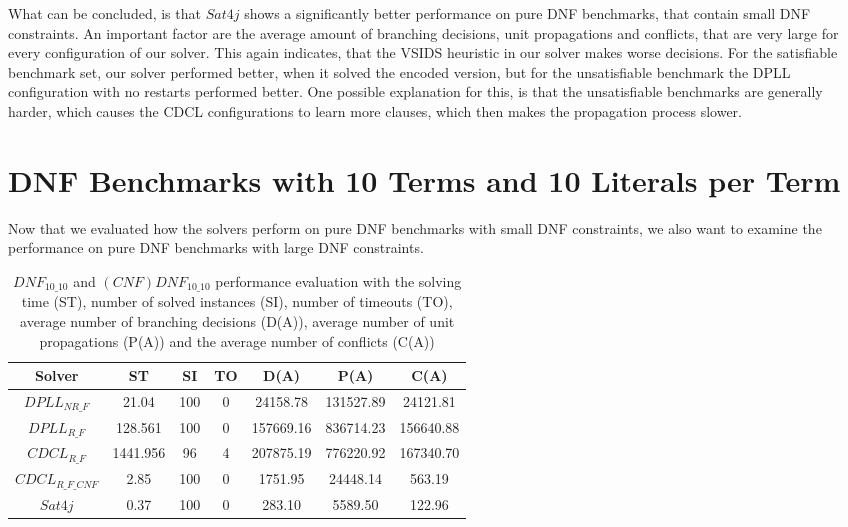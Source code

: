 What can be concluded, is that $Sat4j$ shows a significantly better performance on pure DNF benchmarks, that contain small DNF constraints. An important factor are the average amount of branching decisions, unit propagations and conflicts, that are very large for every configuration of our solver. This again indicates, that the VSIDS heuristic in our solver makes worse decisions. For the satisfiable benchmark set, our solver performed better, when it solved the encoded version, but for the unsatisfiable benchmark the DPLL configuration with no restarts performed better. One possible explanation for this, is that the unsatisfiable benchmarks are generally harder, which causes the CDCL configurations to learn more clauses, which then makes the propagation process slower.

\section{DNF Benchmarks with 10 Terms and 10 Literals per Term}

Now that we evaluated how the solvers perform on pure DNF benchmarks with small DNF constraints, we also want to examine the performance on pure DNF benchmarks with large DNF constraints.

\begin{table}[!htb]
\centering
\caption[$DNF_{10\_10}$ and $(CNF)DNF_{10\_10}$ performance evaluation]{$DNF_{10\_10}$ and $(CNF)DNF_{10\_10}$ performance evaluation with the solving time (ST), number of solved instances (SI), number of timeouts (TO), average number of branching decisions (D(A)), average number of unit propagations (P(A)) and the average number of conflicts (C(A))}
\label{tab:dnf1010Sat}
\begin{tabular}{|c|c|c|c|c|c|c|}
\hline
Solver & ST & SI & TO & D(A) & P(A) & C(A)\\ 
\hline
$DPLL_{NR\_F}$ & 21.04 & 100 & 0 & 24158.78 & 131527.89 & 24121.81 \\ 
\hline
$DPLL_{R\_F}$ & 128.561 & 100 & 0 & 157669.16 & 836714.23 & 156640.88 \\ 
\hline
$CDCL_{R\_F}$ & 1441.956 & 96 & 4 & 207875.19 & 776220.92 & 167340.70 \\ 
\hline
$CDCL_{R\_F\_CNF}$ & 2.85 & 100 & 0 & 1751.95 & 24448.14 & 563.19 \\ 
\hline
$Sat4j$ & 0.37 & 100 & 0 & 283.10 & 5589.50 & 122.96 \\ 
\hline
\end{tabular}
\end{table}


